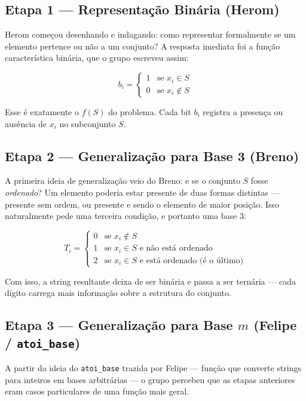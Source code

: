 \documentclass[12pt, a4paper]{article}
\begin{document}
\subsection{Etapa 1 --- Representação Binária (Herom)}

Herom começou desenhando e indagando: como representar formalmente se um elemento pertence ou não a um conjunto? A resposta imediata foi a função característica binária, que o grupo escreveu assim:

$$
b_i = \begin{cases} 1 & \text{se } x_i \in S \\ 0 & \text{se } x_i \notin S \end{cases}
$$

Esse é exatamente o $f(S)$ do problema. Cada bit $b_i$ registra a presença ou ausência de $x_i$ no subconjunto $S$.

\subsection{Etapa 2 --- Generalização para Base 3 (Breno)}

A primeira ideia de generalização veio do Breno: e se o conjunto $S$ fosse \textit{ordenado}? Um elemento poderia estar presente de duas formas distintas --- presente sem ordem, ou presente e sendo o elemento de maior posição. Isso naturalmente pede uma terceira condição, e portanto uma base 3:

$$
T_i = \begin{cases} 0 & \text{se } x_i \notin S \\ 1 & \text{se } x_i \in S \text{ e não está ordenado} \\ 2 & \text{se } x_i \in S \text{ e está ordenado (é o último)} \end{cases}
$$

Com isso, a string resultante deixa de ser binária e passa a ser ternária --- cada dígito carrega mais informação sobre a estrutura do conjunto.

\subsection{Etapa 3 --- Generalização para Base $m$ (Felipe / \texttt{atoi\_base})}

A partir da ideia do \texttt{atoi\_base} trazida por Felipe --- função que converte strings para inteiros em bases arbitrárias --- o grupo percebeu que as etapas anteriores eram casos particulares de uma função mais geral.
\end{document}
